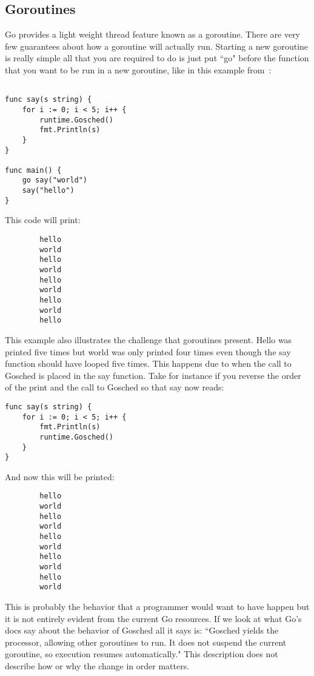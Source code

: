 \documentclass{acm_proc_article-sp}
\begin{document}
	\subsection{Goroutines}
		Go provides a light weight thread feature known as a goroutine. There are very few guarantees about how a goroutine will actually run. Starting a new goroutine is really simple all that you are required to do is just put ``go" before the function that you want to be run in a new goroutine, like in this example from~\cite{go:tour}:
		
		\begin{verbatim}
				
func say(s string) {
	for i := 0; i < 5; i++ {
		runtime.Gosched()
		fmt.Println(s)
	}
}

func main() {
	go say("world")
	say("hello")
}
		\end{verbatim}
		
		This code will print:
		
		\begin{verbatim}
		hello
		world
		hello
		world
		hello
		world
		hello
		world
		hello
		\end{verbatim}
		
		This example also illustrates the challenge that goroutines present. Hello was printed five times but world was only printed four times even though the say function should have looped five times. This happens due to when the call to Gosched is placed in the say function. Take for instance if you reverse the order of the print and the call to Gosched so that say now reads:
		
		\begin{verbatim}
func say(s string) {
	for i := 0; i < 5; i++ {
		fmt.Println(s)
		runtime.Gosched()
	}
}
		\end{verbatim}
		
		And now this will be printed: 
		
		\begin{verbatim}
		hello
		world
		hello	
		world
		hello
		world
		hello
		world
		hello
		world
		\end{verbatim}
		
		This is probably the behavior that a programmer would want to have happen but it is not entirely evident from the current Go resources. If we look at what Go's docs say about the behavior of Gosched all it says is: ``Gosched yields the processor, allowing other goroutines to run. It does not suspend the current goroutine, so execution resumes automatically." This description does not describe how or why the change in order matters. 
		
\end{document}
